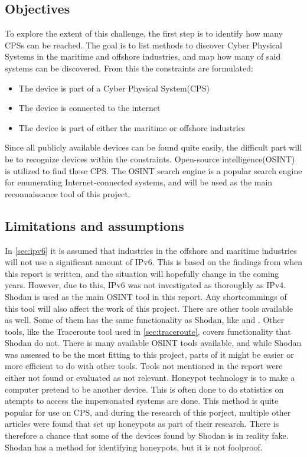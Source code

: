 \subsection{Objectives}
To explore the extent of this challenge, the first step is to identify how many CPSs can be reached. The goal is to list methods to discover Cyber Physical Systems in the maritime and offshore industries, and map how many of said systems can be discovered. From this the constraints are formulated:
\begin{itemize}
    \item The device is part of a Cyber Physical System(CPS)
    \item The device is connected to the internet
    \item The device is part of either the maritime or offshore industries
\end{itemize}
Since all publicly available devices can be found quite easily, the difficult part will be to recognize devices within the constraints.
Open-source intelligence(OSINT) is utilized to find these CPS. The OSINT search engine \href{https://shodan.io}{\color{blue}{Shodan}} is a popular search engine for enumerating Internet-connected systems, and will be used as the main reconnaissance tool of this project. 

\subsection{Limitations and assumptions} \label{sec:limits}
In \cref{sec:ipv6} it is assumed that industries in the offshore and maritime industries will not use a significant amount of IPv6. This is based on the findings from when this report is written, and the situation will hopefully change in the coming years. However, due to this, IPv6 was not investigated as thoroughly as IPv4.
Shodan is used as the main OSINT tool in this report. Any shortcommings of this tool will also affect the work of this project.
There are other tools available as well. Some of them has the same functionality as Shodan, like \href{https://censys.io/}{\color{blue}{Censys}} and \href{www.zoomeye.org}{\color{blue}{ZoomEye}}. Other tools, like the Traceroute tool used in \cref{sec:traceroute}, covers functionality that Shodan do not. There is many available OSINT tools available, and while Shodan was assessed to be the most fitting to this project, parts of it might be easier or more efficient to do with other tools. Tools not mentioned in the report were either not found or evaluated as not relevant.
Honeypot technology is to make a computer pretend to be another device. This is often done to do statistics on atempts to access the impersonated systems are done. This method is quite popular for use on CPS, and during the research of this porject, multiple other articles were found that set up honeypots as part of their research.\cite{bodenheim_butts_dunlap_mullins_2014}\cite{ICS_shodan_article} There is therefore a chance that some of the devices found by Shodan is in reality fake. Shodan has a method for identifying honeypots, but it is not foolproof.


